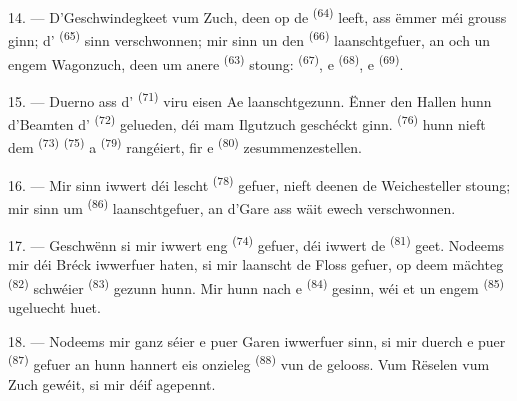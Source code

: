 \VUsaut{3.0mm}
\VUsaut{3.0mm}

14. --- D'Geschwindegkeet vum Zuch, deen op de 
\textsuperscript{(64)} leeft, ass ëmmer méi grouss ginn; d'
\textsuperscript{(65)} sinn verschwonnen; mir sinn un den 
\textsuperscript{(66)} laanschtgefuer, an och un engem Wagonzuch, deen um anere
 \textsuperscript{(63)} stoung: 
\textsuperscript{(67)}, e  \textsuperscript{(68)}, e
 \textsuperscript{(69)}.


15. --- Duerno ass d' \textsuperscript{(71)} viru eisen Ae
laanschtgezunn. Ënner den Hallen hunn d'Beamten d'
\textsuperscript{(72)} gelueden, déi mam Ilgutzuch geschéckt ginn.
 \textsuperscript{(76)} hunn nieft dem
 \textsuperscript{(73)} 
\textsuperscript{(75)} a  \textsuperscript{(79)}
rangéiert, fir e  \textsuperscript{(80)} zesummenzestellen.

16. --- Mir sinn iwwert déi lescht  \textsuperscript{(78)} gefuer,
nieft deenen de Weichesteller stoung; mir sinn um 
\textsuperscript{(86)} laanschtgefuer, an d'Gare ass wäit ewech verschwonnen.

17. --- Geschwënn si mir iwwert eng  \textsuperscript{(74)}
gefuer, déi iwwert de  \textsuperscript{(81)} geet. Nodeems mir déi
Bréck iwwerfuer haten, si mir laanscht de Floss gefuer, op deem mächteg
 \textsuperscript{(82)} schwéier 
\textsuperscript{(83)} gezunn hunn. Mir hunn nach e 
\textsuperscript{(84)} gesinn, wéi et un engem  \textsuperscript{(85)}
ugeluecht huet.

18. --- Nodeems mir ganz séier e puer Garen iwwerfuer sinn, si mir duerch e puer
 \textsuperscript{(87)} gefuer an hunn hannert eis onzieleg
 \textsuperscript{(88)} vun de  gelooss. Vum
Rëselen vum Zuch gewéit, si mir déif agepennt.

\VUsaut{3.0mm}
\VUsaut{3.0mm}

